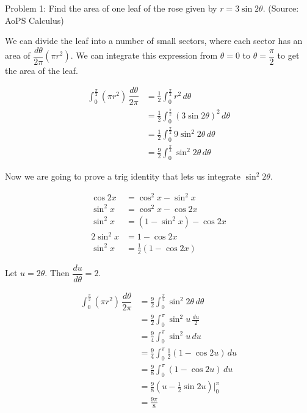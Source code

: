 Problem 1: Find the area of one leaf of the rose given by $r = 3 \sin 2\theta$. (Source: AoPS Calculus)

We can divide the leaf into a number of small sectors, where each sector has an area of $\dfrac{d\theta}{2\pi} (\pi r^2)$. We can integrate this expression from $\theta = 0$ to $\theta = \dfrac{\pi}{2}$ to get the area of the leaf.

\begin{align*}
\int_0^{\frac{\pi}{2}} (\pi r^2) \, \dfrac{d\theta}{2\pi} 
&= \frac{1}{2} \int_0^{\frac{\pi}{2}} r^2 \, d\theta \\
&= \frac{1}{2} \int_0^{\frac{\pi}{2}} (3 \sin 2\theta)^2 \, d\theta \\
&= \frac{1}{2} \int_0^{\frac{\pi}{2}} 9 \sin^2 2\theta \, d\theta \\
&= \frac{9}{2} \int_0^{\frac{\pi}{2}} \sin^2 2\theta \, d\theta
\end{align*}

Now we are going to prove a trig identity that lets us integrate $\sin^2 2\theta$.

\begin{align*}
\cos 2x &= \cos^2 x - \sin^2 x \\
\sin^2x &= \cos^2 x - \cos 2x \\
\sin^2x &= (1 - \sin^2 x) - \cos 2x \\
2 \sin^2 x &= 1 - \cos 2x \\
\sin^2 x &= \frac{1}{2} (1 - \cos 2x)
\end{align*}

Let $u = 2\theta$. Then $\dfrac{du}{d\theta} = 2$.

\begin{align*}
\int_0^{\frac{\pi}{2}} (\pi r^2) \, \dfrac{d\theta}{2\pi}
&= \frac{9}{2} \int_0^{\frac{\pi}{2}} \sin^2 2\theta \, d\theta \\
&= \frac{9}{2} \int_0^{\pi} \sin^2 u \, \frac{du}{2} \\
&= \frac{9}{4} \int_0^{\pi} \sin^2 u \, du \\
&= \frac{9}{4} \int_0^{\pi} \frac{1}{2} (1 - \cos 2u) \, du \\
&= \frac{9}{8} \int_0^{\pi} (1 - \cos 2u) \, du \\
&= \frac{9}{8} (u - \frac{1}{2} \sin 2u) \Bigg|_0^\pi \\
&= \boxed{\frac{9\pi}{8}}
\end{align*}
